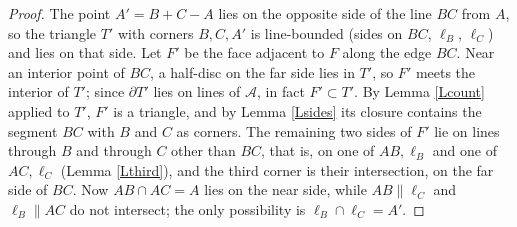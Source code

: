 \documentclass{article}
\begin{document}
	\begin{proof}
		The point $A'=B+C-A$ lies on the opposite side of the line $BC$ from $A$, so the triangle $T'$ with corners $B,C,A'$ is line-bounded (sides on $BC$, $\ell_B$, $\ell_C$) and lies on that side. Let $F'$ be the face adjacent to $F$ along the edge $BC$. Near an interior point of $BC$, a half-disc on the far side lies in $T'$, so $F'$ meets the interior of $T'$; since $\partial T'$ lies on lines of $\mathcal A$, in fact $F'\subset T'$. By Lemma \ref{Lcount} applied to $T'$, $F'$ is a triangle, and by Lemma \ref{Lsides} its closure contains the segment $BC$ with $B$ and $C$ as corners. The remaining two sides of $F'$ lie on lines through $B$ and through $C$ other than $BC$, that is, on one of $AB,\ell_B$ and one of $AC,\ell_C$ (Lemma \ref{Lthird}), and the third corner is their intersection, on the far side of $BC$. Now $AB\cap AC=A$ lies on the near side, while $AB\parallel\ell_C$ and $\ell_B\parallel AC$ do not intersect; the only possibility is $\ell_B\cap\ell_C=A'$.
	\end{proof}
\end{document}
